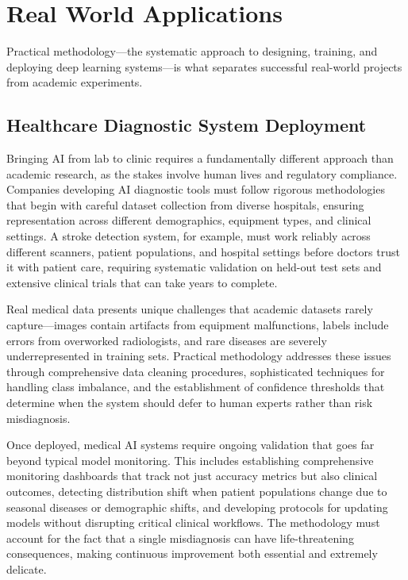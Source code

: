 
\section{Real World Applications}
\label{sec:methodology-real-world}


Practical methodology—the systematic approach to designing, training, and deploying deep learning systems—is what separates successful real-world projects from academic experiments.

\subsection{Healthcare Diagnostic System Deployment}

Bringing AI from lab to clinic requires a fundamentally different approach than academic research, as the stakes involve human lives and regulatory compliance. Companies developing AI diagnostic tools must follow rigorous methodologies that begin with careful dataset collection from diverse hospitals, ensuring representation across different demographics, equipment types, and clinical settings. A stroke detection system, for example, must work reliably across different scanners, patient populations, and hospital settings before doctors trust it with patient care, requiring systematic validation on held-out test sets and extensive clinical trials that can take years to complete.

Real medical data presents unique challenges that academic datasets rarely capture—images contain artifacts from equipment malfunctions, labels include errors from overworked radiologists, and rare diseases are severely underrepresented in training sets. Practical methodology addresses these issues through comprehensive data cleaning procedures, sophisticated techniques for handling class imbalance, and the establishment of confidence thresholds that determine when the system should defer to human experts rather than risk misdiagnosis.

Once deployed, medical AI systems require ongoing validation that goes far beyond typical model monitoring. This includes establishing comprehensive monitoring dashboards that track not just accuracy metrics but also clinical outcomes, detecting distribution shift when patient populations change due to seasonal diseases or demographic shifts, and developing protocols for updating models without disrupting critical clinical workflows. The methodology must account for the fact that a single misdiagnosis can have life-threatening consequences, making continuous improvement both essential and extremely delicate.

